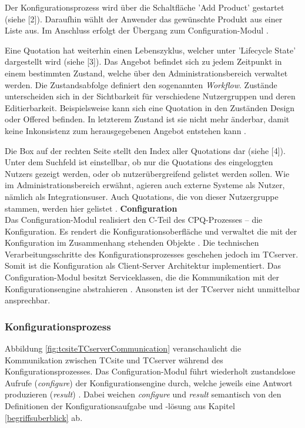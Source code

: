 \documentclass[11pt, a4paper, titlepage, listof=totoc, bibliography=totoc, index=totoc, twoside, openright, headings=normal, draft]{scrreprt}
\begin{document}
Der Konfigurationsprozess wird über die Schaltfläche 'Add Product' gestartet (siehe [2]). Daraufhin wählt der Anwender das gewünschte Produkt aus einer Liste aus. Im Anschluss erfolgt der Übergang zum Configuration-Modul \citep{tactonTCsiteReferenceManual}.

Eine Quotation hat weiterhin einen Lebenszyklus, welcher unter 'Lifecycle State' dargestellt wird (siehe [3]). Das Angebot befindet sich zu jedem Zeitpunkt in einem bestimmten Zustand, welche über den Administrationsbereich verwaltet werden. Die Zustandsabfolge definiert den sogenannten \emph{Workflow}. Zustände unterscheiden sich in der Sichtbarkeit für verschiedene Nutzergruppen und deren Editierbarkeit. Beispielsweise kann sich eine Quotation in den Zuständen \glqq Design\grqq{} oder \glqq Offered\grqq{} befinden. In letzterem Zustand ist sie nicht mehr änderbar, damit keine Inkonsistenz zum herausgegebenen Angebot entstehen kann \citep{tactonTCsiteReferenceManual}.

Die Box auf der rechten Seite stellt den Index aller Quotations dar (siehe [4]). Unter dem Suchfeld ist einstellbar, ob nur die Quotations des eingeloggten Nutzers gezeigt werden, oder ob nutzerübergreifend gelistet werden sollen. Wie im Administrationsbereich erwähnt, agieren auch externe Systeme als Nutzer, nämlich als Integrationsuser. Auch Quotations, die von dieser Nutzergruppe stammen, werden hier gelistet \citep{tactonTCsiteReferenceManual}.
\newpage
\textbf{Configuration}\\
Das Configuration-Modul realisiert den C-Teil des CPQ-Prozesses -- die Konfiguration. Es rendert die Konfigurationsoberfläche und verwaltet die mit der Konfiguration im Zusammenhang stehenden Objekte \citep{tactonTCsiteDevelopmentManual}. Die  technischen Verarbeitungsschritte des Konfigurationsprozesses geschehen jedoch im TCserver. Somit ist die Konfiguration als Client-Server Architektur implementiert. Das Configuration-Modul besitzt Serviceklassen, die die Kommunikation mit der Konfigurationsengine abstrahieren \citep{tactonTCsiteApiDocu}. Ansonsten ist der TCserver nicht unmittelbar ansprechbar.

\subsubsection{Konfigurationsprozess}
\label{TCsiteKonfigurationsprozess}

Abbildung \ref{fig:tcsiteTCserverCommunication} veranschaulicht die Kommunikation zwischen TCsite und TCserver während des Konfigurationsprozesses. Das Configuration-Modul führt wiederholt zustandslose Aufrufe (\emph{configure}) der Konfigurationsengine durch, welche jeweils eine Antwort produzieren (\emph{result}) \citep{tactonTCsiteDevelopmentManual}. Dabei weichen \emph{configure} und \emph{result} semantisch von den Definitionen der Konfigurationsaufgabe und -lösung aus Kapitel \ref{begriffsuberblick} ab.
\end{document}

